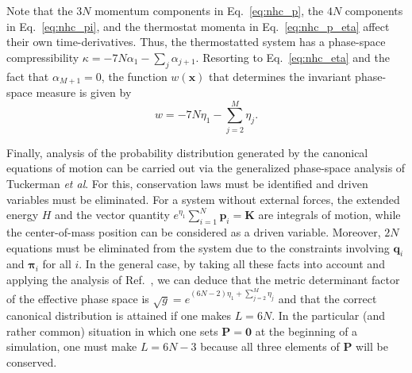 \documentclass[aip,jcp,reprint,amsmath,amssymb]{revtex4-1}
\newcommand{\vt}[1]{\boldsymbol{\mathbf{#1}}}           %
\begin{document}
Note that the $3N$ momentum components in Eq.~\eqref{eq:nhc_p}, the $4N$ components in Eq.~\eqref{eq:nhc_pi}, and the thermostat momenta in Eq.~\eqref{eq:nhc_p_eta} affect their own time-derivatives. Thus, the thermostatted system has a phase-space compressibility $\kappa = -7N \alpha_1 - \sum_j \alpha_{j+1}$. Resorting to Eq.~\eqref{eq:nhc_eta} and the fact that $\alpha_{M+1} = 0$, the function $w(\vt x)$ that determines the invariant phase-space measure is given by
\begin{equation}
\label{eq:nhc_measure}
w = -7N \eta_1 - \sum_{j=2}^M \eta_j.
\end{equation}

Finally, analysis of the probability distribution generated by the canonical equations of motion can be carried out via the generalized phase-space analysis of Tuckerman \textit{et al}.\cite{Tuckerman2001} For this, conservation laws must be identified and driven variables must be eliminated. For a system without external forces, the extended energy $H$ and the vector quantity $e^{\eta_1}\sum_{i=1}^N {\vt p}_i = \vt K$ are integrals of motion, while the center-of-mass position can be considered as a driven variable.\cite{Tuckerman2001} Moreover, $2N$ equations must be eliminated from the system due to the constraints involving $\vt q_i$ and $\vt \pi_i$ for all $i$. In the general case, by taking all these facts into account and applying the analysis of Ref.~, we can deduce that the metric determinant factor of the effective phase space is $\sqrt{g} = e^{(6N-2) \eta_1 + \sum_{j=2}^M \eta_j}$ and that the correct canonical distribution is attained if one makes $L = 6N$. In the particular (and rather common) situation in which one sets $\vt P = \vt 0$ at the beginning of a simulation, one must make $L = 6N - 3$ because all three elements of $\vt P$ will be conserved.\cite{Martyna1994}
\end{document}
